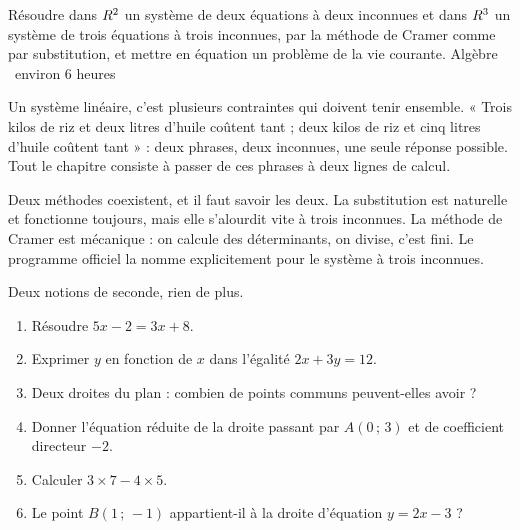   {Résoudre dans $R^{2}$ un système de deux équations à deux inconnues et
   dans $R^{3}$ un système de trois équations à trois inconnues, par la
   méthode de Cramer comme par substitution, et mettre en équation un
   problème de la vie courante.}
  {Algèbre \textbullet\ environ 6 heures}

Un système linéaire, c'est plusieurs contraintes qui doivent tenir ensemble.
« Trois kilos de riz et deux litres d'huile coûtent tant ; deux kilos de riz
et cinq litres d'huile coûtent tant » : deux phrases, deux inconnues, une
seule réponse possible. Tout le chapitre consiste à passer de ces phrases à
deux lignes de calcul.

Deux méthodes coexistent, et il faut savoir les deux. La substitution est
naturelle et fonctionne toujours, mais elle s'alourdit vite à trois
inconnues. La méthode de Cramer est mécanique : on calcule des déterminants,
on divise, c'est fini. Le programme officiel la nomme explicitement pour le
système à trois inconnues.

\begin{revision}
Deux notions de seconde, rien de plus.

\begin{enumerate}[label=\textbf{\arabic*.}, leftmargin=*, itemsep=0.35em]
  \item Résoudre $5x-2 = 3x+8$.
  \item Exprimer $y$ en fonction de $x$ dans l'égalité $2x+3y = 12$.
  \item Deux droites du plan : combien de points communs peuvent-elles
        avoir ?
  \item Donner l'équation réduite de la droite passant par $A(0\,;\,3)$ et
        de coefficient directeur $-2$.
  \item Calculer $3\times7-4\times5$.
  \item Le point $B(1\,;\,-1)$ appartient-il à la droite d'équation
        $y = 2x-3$ ?
\end{enumerate}
\end{revision}

